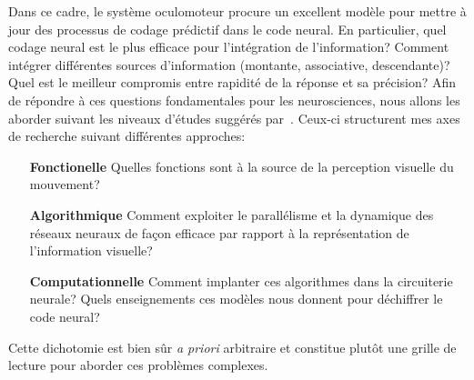 \documentclass[11pt,french,a4paper,oneside]{article}%
\begin{document}
Dans ce cadre, le système oculomoteur procure un excellent modèle pour mettre à jour des processus de codage prédictif dans le code neural. En particulier, quel codage neural est le plus efficace pour l'intégration de l'information? Comment intégrer différentes sources d'information (montante, associative, descendante)? Quel est le meilleur compromis entre rapidité de la réponse et sa précision? %
%
Afin de répondre à ces questions fondamentales pour les neurosciences, nous allons les aborder suivant les niveaux d'études suggérés par~\citet{Marr83}. Ceux-ci structurent mes axes de recherche suivant différentes approches:
\begin{enumerate}
\item[\textbf{Fonctionelle}] Quelles fonctions sont à la source de %
la perception visuelle du mouvement?
\item[\textbf{Algorithmique}] Comment exploiter le parallélisme et la dynamique des réseaux neuraux de façon efficace par rapport à
la représentation de l'information visuelle? %
\item[\textbf{Computationnelle}] Comment implanter ces algorithmes dans la circuiterie neurale? Quels enseignements ces modèles nous donnent pour déchiffrer le code neural?
\end{enumerate}
Cette dichotomie est bien sûr \emph{a priori} arbitraire et constitue plutôt une grille de lecture pour aborder ces problèmes complexes. %
\end{document}
